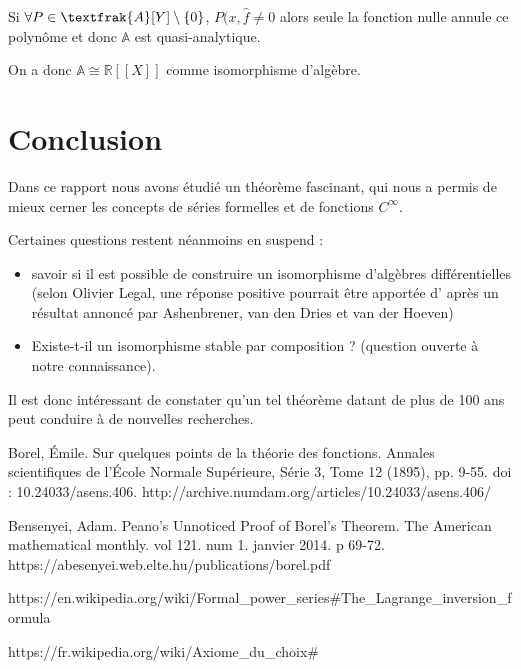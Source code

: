 \documentclass[12pt,a4paper]{amsart}
\begin{document}
Si $\forall P \in \textfrak{A}[Y]\setminus \{0\}$, $P(x,\hat{f} \neq 0$ alors seule la fonction nulle annule ce polynôme et donc $\mathbb{A}$ est quasi-analytique. 

On a donc $\mathbb{A} \cong \mathbb{R}[[X]]$ comme isomorphisme d'algèbre. 
\section{Conclusion}
Dans ce rapport nous avons étudié un théorème fascinant, qui nous a permis de mieux cerner les concepts de séries formelles et de fonctions $C^{\infty}$. 

Certaines questions restent néanmoins en suspend : 

\begin{itemize}
\item savoir si il est possible de  construire un isomorphisme d'algèbres différentielles (selon Olivier Legal, une réponse positive pourrait être apportée d' après un résultat annoncé par Ashenbrener, van den Dries et van der Hoeven)

\item  	Existe-t-il un isomorphisme stable par composition ? (question ouverte à notre connaissance).
\end{itemize}
Il est donc intéressant de constater qu'un tel théorème datant de plus de 100 ans peut conduire à de nouvelles recherches.


\begin{thebibliography}{9}

Borel, Émile. Sur quelques points de la théorie des fonctions. Annales scientifiques de l'École Normale Supérieure, Série 3, Tome 12 (1895), pp. 9-55. doi : 10.24033/asens.406. http://archive.numdam.org/articles/10.24033/asens.406/

 Bensenyei, Adam. Peano's Unnoticed Proof of Borel's Theorem. The American mathematical monthly. vol 121. num 1. janvier 2014. p 69-72. https://abesenyei.web.elte.hu/publications/borel.pdf

 https://en.wikipedia.org/wiki/Formal\_power\_series\#The\_Lagrange\_inversion\_formula

 https://fr.wikipedia.org/wiki/Axiome\_du\_choix\#

\end{thebibliography} 
\end{document}
